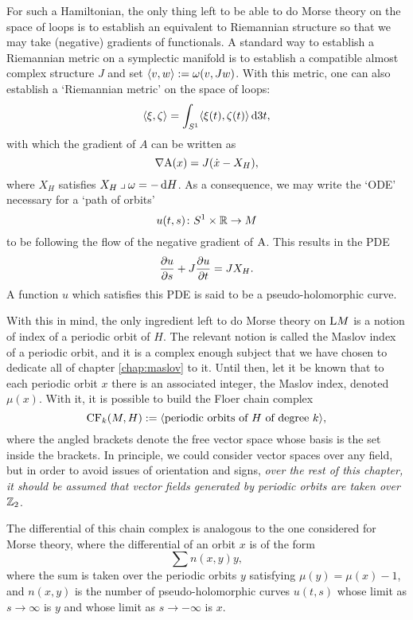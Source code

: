 For such a Hamiltonian, the only thing left to be able to do Morse theory on the space of loops is to establish an equivalent to Riemannian structure so that we may take (negative) gradients of functionals. A standard way to establish a Riemannian metric on a symplectic manifold is to establish a compatible almost complex structure $J$ and set $\braket{v,w} := \omega(v, Jw)$. With this metric, one can also establish a `Riemannian metric' on the space of loops:
\begin{equation}
\braket{\xi, \zeta} = \int_{S^1} \braket{\xi(t), \zeta(t)} \dl3t,
\end{equation}
with which the gradient of $A$ can be written as
\begin{equation}
\grad \AA(x) = J(\dot x - X_H),
\end{equation}
where $X_H$ satisfies $X_H \into \omega = - \dl H$. As a consequence, we may write the `ODE' necessary for a `path of orbits'
\begin{equation}
u(t,s) \colon S^1 \times \R \to M
\end{equation}
to be following the flow of the negative gradient of $\AA$. This results in the PDE
\begin{equation}
\diffp u s + J \diffp u t = J X_H.
\end{equation}
A function $u$ which satisfies this PDE is said to be a pseudo-holomorphic curve.

With this in mind, the only ingredient left to do Morse theory on $\LL M$ is a notion of index of a periodic orbit of $H$. The relevant notion is called the Maslov index of a periodic orbit, and it is a complex enough subject that we have chosen to dedicate all of chapter \ref{chap:maslov} to it. Until then, let it be known that to each periodic orbit $x$ there is an associated integer, the Maslov index, denoted $\mu(x)$. With it, it is possible to build the Floer chain complex
\begin{equation}
\CF_k(M, H) := \braket{\text{periodic orbits of $H$ of degree $k$}},
\end{equation}
where the angled brackets denote the free vector space whose basis is the set inside the brackets. In principle, we could consider vector spaces over any field, but in order to avoid issues of orientation and signs, \emph{over the rest of this chapter, it should be assumed that vector fields generated by periodic orbits are taken over $\Z_2$}.

The differential of this chain complex is analogous to the one considered for Morse theory, where the differential of an orbit $x$ is of the form
\begin{equation}
\sum n(x,y) y,
\end{equation}
where the sum is taken over the periodic orbits $y$ satisfying $\mu(y) = \mu(x) - 1$, and $n(x,y)$ is the number of pseudo-holomorphic curves $u(t,s)$ whose limit as $s \to \infty$ is $y$ and whose limit as $s \to -\infty$ is $x$.

